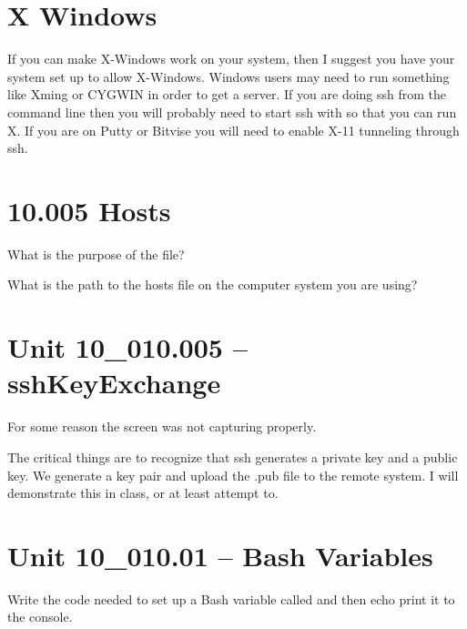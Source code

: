 \documentclass[letterpaper,12pt]{exam}
\newcommand{\unit}{Unit 10}
\begin{document}
\section*{X Windows} %
If you can make X-Windows work on your system, then I suggest you have your system set up to allow X-Windows.  Windows users may need to run something like Xming or CYGWIN in order to get a server.
If you are doing ssh from the command line then you will probably need to start ssh with  so that you can run X. If you are on Putty or Bitvise you will need to enable X-11 tunneling through ssh.

\begin {questions}

\section*{10.005 Hosts} %

\begin{samepage}
\question What is the purpose of the  file?
\vspace{5mm}
\end{samepage}

\begin{samepage}
\question What is the path to the hosts file on the computer system you are using? 
\vspace{5mm}
\end{samepage}

\section*{\unit\_010.005 -- sshKeyExchange}
\noindent For some reason the screen was not capturing properly.  

\noindent The critical things are to recognize that ssh generates a private key and a public key.  We generate a key pair and upload the .pub file to the remote system.  I will demonstrate this in class, or at least attempt to.

\section*{\unit\_010.01 -- Bash Variables}

\begin{samepage}
\question Write the code needed to set up a Bash variable called  and then echo print it to the console.
\vspace{15mm}
\end{samepage}


\end{questions}
\end{document}
